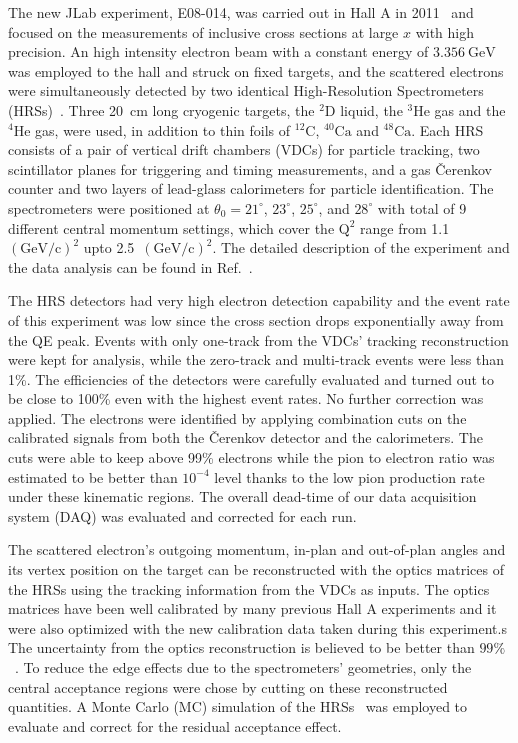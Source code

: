 
The new JLab experiment, E08-014, was carried out in Hall A in 2011~\cite{e08014_pr} and focused on the measurements of inclusive cross sections at large $x$ with high precision. An high intensity electron beam with a constant energy of $3.356~\mathrm{GeV}$ was employed to the hall and struck on fixed targets, and the scattered electrons were simultaneously detected by two identical High-Resolution Spectrometers (HRSs)~\cite{halla_nim}. Three 20~cm long cryogenic targets, the $\mathrm{^{2}D}$ liquid, the $\mathrm{^{3}He}$ gas and the $\mathrm{^{4}He}$ gas, were used, in addition to thin foils of $\mathrm{^{12}C}$, $\mathrm{^{40}Ca}$ and $\mathrm{^{48}Ca}$. Each HRS consists of a pair of vertical drift chambers (VDCs) for particle tracking, two scintillator planes for triggering and timing measurements, and a gas \v{C}erenkov counter and two layers of lead-glass calorimeters for particle identification. The spectrometers were positioned at $\theta_{0}=21^\circ$, $23^\circ$, $25^\circ$, and $28^\circ$ with total of 9 different central momentum settings, which cover the $\mathrm{Q^{2}}$ range from 1.1~$\mathrm{(GeV/c)^{2}}$ upto 2.5~$\mathrm{(GeV/c)^{2}}$. The detailed description of the experiment and the data analysis can be found in Ref.~\cite{zye_thesis}.

 The HRS detectors had very high electron detection capability and the event rate of this experiment was low since the cross section drops exponentially away from the QE peak. Events with only one-track from the VDCs' tracking reconstruction were kept for analysis, while the zero-track and multi-track events were less than 1\%. The efficiencies of the detectors were carefully evaluated and turned out to be close to 100\% even with the highest event rates. No further correction was applied. The electrons were identified by applying combination cuts on the calibrated signals from both the \v{C}erenkov detector and the calorimeters. The cuts were able to keep above 99\% electrons while the pion to electron ratio was estimated to be better than $\mathrm{10^{-4}}$ level thanks to the low pion production rate under these kinematic regions. The overall dead-time of our data acquisition system (DAQ) was evaluated and corrected for each run.

The scattered electron's outgoing momentum, in-plan and out-of-plan angles and its vertex position on the target can be reconstructed with the optics matrices of the HRSs using the tracking information from the VDCs as inputs. The optics matrices have been well calibrated by many previous Hall A experiments and it were also optimized with the new calibration data taken during this experiment.s The uncertainty from the optics reconstruction is believed to be better than $99\%$~\cite{halla_nim}. To reduce the edge effects due to the spectrometers' geometries, only the central acceptance regions were chose by cutting on these reconstructed quantities. A Monte Carlo (MC) simulation of the HRSs~\cite{zye_thesis} was employed to evaluate and correct for the residual acceptance effect. 

